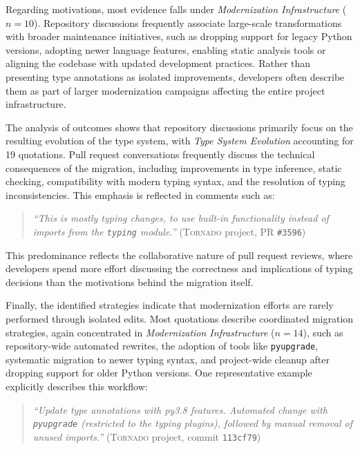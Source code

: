 Regarding motivations, most evidence falls under \textit{Modernization Infrastructure} ($n = 10$). Repository discussions frequently associate large-scale transformations with broader maintenance initiatives, such as dropping support for legacy Python versions, adopting newer language features, enabling static analysis tools or aligning the codebase with updated development practices. Rather than presenting type annotations as isolated improvements, developers often describe them as part of larger modernization campaigns affecting the entire project infrastructure.

The analysis of outcomes shows that repository discussions primarily focus on the resulting evolution of the type system, with \textit{Type System Evolution} accounting for 19 quotations. Pull request conversations frequently discuss the technical consequences of the migration, including improvements in type inference, static checking, compatibility with modern typing syntax, and the resolution of typing inconsistencies. This emphasis is reflected in comments such as:

\begin{quote}
\textit{``This is mostly typing changes, to use built-in functionality instead of imports from the \texttt{typing} module.''} (\textsc{Tornado} project, PR \texttt{\#3596})
\end{quote}

This predominance reflects the collaborative nature of pull request reviews, where developers spend more effort discussing the correctness and implications of typing decisions than the motivations behind the migration itself.

Finally, the identified strategies indicate that modernization efforts are rarely performed through isolated edits. Most quotations describe coordinated migration strategies, again concentrated in \textit{Modernization Infrastructure} ($n = 14$), such as repository-wide automated rewrites, the adoption of tools like \texttt{pyupgrade}, systematic migration to newer typing syntax, and project-wide cleanup after dropping support for older Python versions. One representative example explicitly describes this workflow:

\begin{quote}
\textit{``Update type annotations with py3.8 features. Automated change with \texttt{pyupgrade} (restricted to the typing plugins), followed by manual removal of unused imports.''} (\textsc{Tornado} project, commit \texttt{113cf79})
\end{quote}

